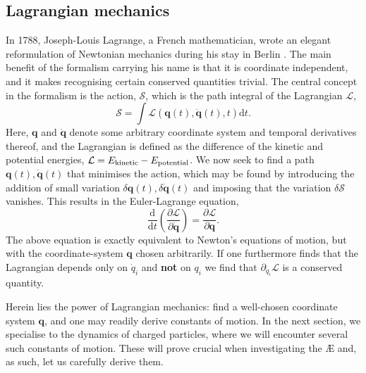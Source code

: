 \subsection*{Lagrangian mechanics}
In 1788, Joseph-Louis Lagrange, a French mathematician, wrote an elegant reformulation of Newtonian mechanics during his stay in Berlin \cite{lagrange1853mecanique}. The main benefit of the formalism carrying his name is that it is coordinate independent, and it makes recognising certain conserved quantities trivial. The central concept in the formalism is the action, $\mathcal{S}$, which is the path integral of the Lagrangian $\mathcal{L}$,
\begin{equation}
    \mathcal{S} = \int \mathcal{L}(\boldsymbol{q}(t),\dot{\boldsymbol{q}}(t),t) \mathrm{d} t.
\end{equation}
Here, $\boldsymbol{q}$ and $\dot{\boldsymbol{q}}$ denote some arbitrary coordinate system and temporal derivatives thereof, and the Lagrangian is defined as the difference of the kinetic and potential energies, $\mathcal{L} = E_{\rm kinetic} - E_{\rm potential}$. We now seek to find a path $\boldsymbol{q}(t),\dot{\boldsymbol{q}}(t)$ that minimises the action, which may be found by introducing the addition of small variation $ \delta \boldsymbol{q}(t),\delta \dot{\boldsymbol{q}}(t)$ and imposing that the variation $\delta \mathcal{S}$ vanishes. This results in the Euler-Lagrange equation,
\begin{equation}
    \frac{\mathrm{d}}{\mathrm{d} t} \left( \frac{\partial \mathcal{L}}{\partial \dot{\boldsymbol{q}}} \right) = \frac{\partial \mathcal{L}}{ \partial \boldsymbol{q} }.
    \label{eq: EL equation}
\end{equation}
The above equation is exactly equivalent to Newton's equations of motion, but with the coordinate-system $\boldsymbol{q}$ chosen arbitrarily. If one furthermore finds that the Lagrangian depends only on $\dot{q}_i$ and \textbf{not} on $q_i$ we find that $\partial_{\dot{q}_{i}} \mathcal{L}$ is a conserved quantity. \par 
Herein lies the power of Lagrangian mechanics: find a well-chosen coordinate system $\boldsymbol{q}$, and one may readily derive constants of motion. In the next section, we specialise to the dynamics of charged particles, where we will encounter several such constants of motion. These will prove crucial when investigating the \AE{} and, as such, let us carefully derive them.
